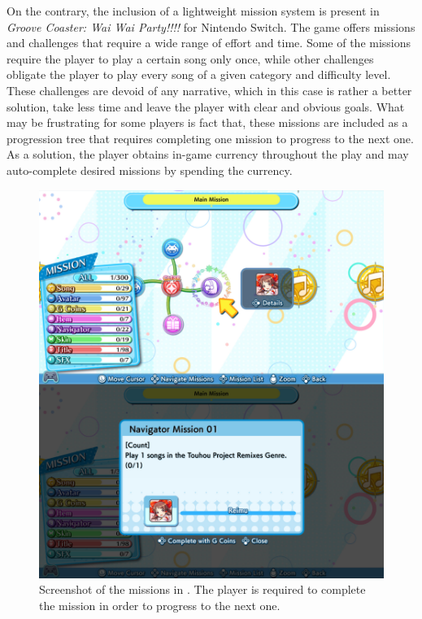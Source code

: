 On the contrary, the inclusion of a lightweight mission system is present in \textit{Groove Coaster: Wai Wai Party!!!!} for Nintendo Switch. The game offers missions and challenges that require a wide range of effort and time. Some of the missions require the player to play a certain song only once, while other challenges obligate the player to play every song of a given category and difficulty level. These challenges are devoid of any narrative, which in this case is rather a better solution, take less time and leave the player with clear and obvious goals. What may be frustrating for some players is fact that, these missions are included as a progression tree that requires completing one mission to progress to the next one. As a solution, the player obtains in-game currency throughout the play and may auto-complete desired missions by spending the currency.

\begin{figure}[h]
    \centering\includegraphics[scale=0.2]{obrazki/groovecoastermissions.jpg}
    \caption{Screenshot of the missions in . The player is required to complete the mission in order to progress to the next one. \cite{groovecoastermissions}}
    \label{fig:gcmission}
\end{figure}


